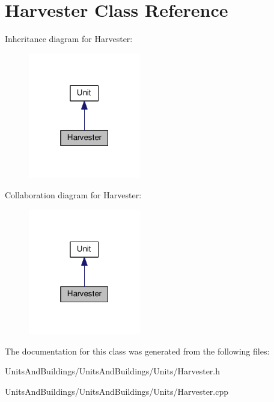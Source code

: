 \hypertarget{class_harvester}{}\section{Harvester Class Reference}
\label{class_harvester}


Inheritance diagram for Harvester\+:
\nopagebreak
\begin{figure}[H]
\begin{center}
\leavevmode
\includegraphics[width=139pt]{class_harvester__inherit__graph}
\end{center}
\end{figure}


Collaboration diagram for Harvester\+:
\nopagebreak
\begin{figure}[H]
\begin{center}
\leavevmode
\includegraphics[width=139pt]{class_harvester__coll__graph}
\end{center}
\end{figure}


The documentation for this class was generated from the following files\+:\begin{DoxyCompactItemize}
\item 
Units\+And\+Buildings/\+Units\+And\+Buildings/\+Units/Harvester.\+h\item 
Units\+And\+Buildings/\+Units\+And\+Buildings/\+Units/Harvester.\+cpp\end{DoxyCompactItemize}
